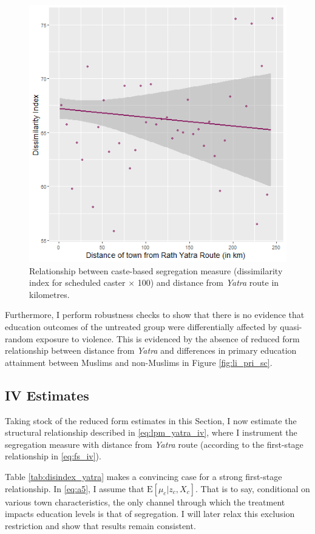 \documentclass{article}
\newcommand{\E}{\mathrm{E}}
\begin{document}
\begin{figure}[H]
    \centering
    \includegraphics[scale = 0.6]{images/graph_sc_disindex.png}
    \caption{Relationship between caste-based segregation measure (dissimilarity index for scheduled caster $\times$ 100) and distance from \textit{Yatra} route in kilometres.}
    \label{fig:sc_disindex}
\end{figure}

Furthermore, I perform robustness checks to show that there is no evidence that education outcomes of the untreated group were differentially affected by quasi-random exposure to violence. This is evidenced by the absence of reduced form relationship between distance from \textit{Yatra} and differences in primary education attainment between Muslims and non-Muslims in Figure \ref{fig:li_pri_sc}. 

\subsection{IV Estimates}
Taking stock of the reduced form estimates in this Section, I now estimate the structural relationship described in \eqref{eq:lpm_yatra_iv}, where I instrument the segregation measure with distance from \textit{Yatra} route (according to the first-stage relationship in \eqref{eq:fs_iv}).

Table \ref{tab:disindex_yatra} makes a convincing case for a strong first-stage relationship. In \eqref{eq:a5}, I assume that $\E [ \mu_c | z_c, X_c ]$. That is to say, conditional on various town characteristics, the only channel through which the treatment impacts education levels is that of segregation. I will later relax this exclusion restriction and show that results remain consistent. 
\end{document}
